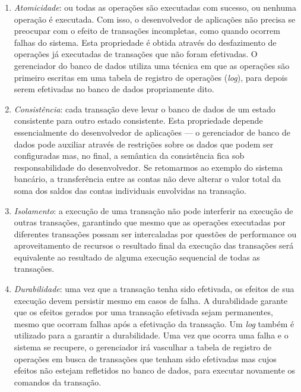 \documentclass[11pt,twoside,a4paper]{book}
\begin{document}
\begin{enumerate}
\item \emph{Atomicidade}: ou todas as operações são executadas com sucesso, ou nenhuma operação é executada. Com isso, o desenvolvedor de aplicações não precisa se preocupar com o efeito de transações incompletas, como quando ocorrem falhas do sistema. Esta propriedade é obtida através do desfazimento de operações já executadas de transações que não foram efetivadas. O gerenciador do banco de dados utiliza uma técnica em que as operações são primeiro escritas em uma tabela de registro de operações (\emph{log}), para depois serem efetivadas no banco de dados propriamente dito.
\item \emph{Consistência}: cada transação deve levar o banco de dados de um estado consistente para outro estado consistente. Esta propriedade depende essencialmente do desenvolvedor de aplicações --- o gerenciador de banco de dados pode auxiliar através de restrições sobre os dados que podem ser configuradas mas, no final, a semântica da consistência fica sob responsabilidade do desenvolvedor. Se retomarmos ao exemplo do sistema bancário, a transferência entre as contas não deve alterar o valor total da soma dos saldos das contas individuais envolvidas na transação.
\item \emph{Isolamento}: a execução de uma transação não pode interferir na execução de outras transações, garantindo que mesmo que as operações executadas por diferentes transações possam ser intercaladas por questões de performance ou aproveitamento de recursos o resultado final da execução das transações será equivalente ao resultado de alguma execução sequencial de todas as transações.
\item \emph{Durabilidade}: uma vez que a transação tenha sido efetivada, os efeitos de sua execução devem persistir mesmo em casos de falha. A durabilidade garante que os efeitos gerados por uma transação efetivada sejam permanentes, mesmo que ocorram falhas após a efetivação da transação. Um \emph{log} também é utilizado para a garantir a durabilidade. Uma vez que ocorra uma falha e o sistema se recupere, o gerenciador irá vasculhar a tabela de registro de operações em busca de transações que tenham sido efetivadas mas cujos efeitos não estejam refletidos no banco de dados, para executar novamente os comandos da transação.
\end{enumerate}

\end{document}
